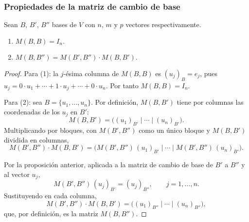 \begin{frame}[allowframebreaks,t]
    \frametitle{Propiedades de la matriz de cambio de base}

    \begin{proposition}
        Sean $B$, $B'$, $B''$ bases de $V$ con $n$, $m$ y $p$
        vectores respectivamente.
        \begin{enumerate}
            \item $M(B,B)=I_n$.
            \item $M(B,B'')=M(B',B'')\cdot M(B,B')$.
        \end{enumerate}
    \end{proposition}

    \begin{proof}
        Para (1): la $j$-ésima columna de $M(B,B)$ es $(u_j)_B=e_j$,
        pues $u_j=0\cdot u_1+\cdots+1\cdot u_j+\cdots+0\cdot u_n$.
        Por tanto $M(B,B)=I_n$.

        Para (2): sea $B=\{u_1,\ldots,u_n\}$. Por definición,
        $M(B,B')$ tiene por columnas las coordenadas de los $u_j$ en $B'$:
        \[
            M(B,B')=\bigl((u_1)_{B'}\mid\cdots\mid(u_n)_{B'}\bigr).
        \]
        Multiplicando por bloques, con $M(B',B'')$ como un único bloque y
        $M(B,B')$ dividida en columnas,
        \[
            M(B',B'')\cdot M(B,B')
            =\bigl(M(B',B'')\,(u_1)_{B'}\mid\cdots\mid M(B',B'')\,(u_n)_{B'}\bigr).
        \]

        Por la proposición anterior, aplicada a la matriz de cambio de
        base de $B'$ a $B''$ y al vector $u_j$,
        \[
            M(B',B'')\,(u_j)_{B'}=(u_j)_{B''},
            \qquad j=1,\ldots,n.
        \]
        Sustituyendo en cada columna,
        \[
            M(B',B'')\cdot M(B,B')
            =\bigl((u_1)_{B''}\mid\cdots\mid(u_n)_{B''}\bigr),
        \]
        que, por definición, es la matriz $M(B,B'')$.
    \end{proof}
\end{frame}


